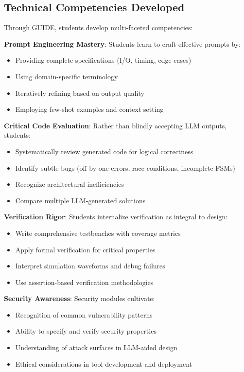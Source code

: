 \documentclass[10pt,conference]{IEEEtran}
\begin{document}
\subsection{Technical Competencies Developed}

Through GUIDE, students develop multi-faceted competencies:

\textbf{Prompt Engineering Mastery}: Students learn to craft effective prompts by:
\begin{itemize}
    \item Providing complete specifications (I/O, timing, edge cases)
    \item Using domain-specific terminology
    \item Iteratively refining based on output quality
    \item Employing few-shot examples and context setting
\end{itemize}

\textbf{Critical Code Evaluation}: Rather than blindly accepting LLM outputs, students:
\begin{itemize}
    \item Systematically review generated code for logical correctness
    \item Identify subtle bugs (off-by-one errors, race conditions, incomplete FSMs)
    \item Recognize architectural inefficiencies
    \item Compare multiple LLM-generated solutions
\end{itemize}

\textbf{Verification Rigor}: Students internalize verification as integral to design:
\begin{itemize}
    \item Write comprehensive testbenches with coverage metrics
    \item Apply formal verification for critical properties
    \item Interpret simulation waveforms and debug failures
    \item Use assertion-based verification methodologies
\end{itemize}

\textbf{Security Awareness}: Security modules cultivate:
\begin{itemize}
    \item Recognition of common vulnerability patterns
    \item Ability to specify and verify security properties
    \item Understanding of attack surfaces in LLM-aided design
    \item Ethical considerations in tool development and deployment
\end{itemize}
\end{document}
